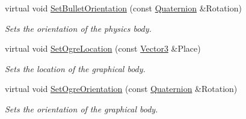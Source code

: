 \begin{DoxyCompactItemize}
virtual void \hyperlink{classMezzanine_1_1ActorBase_a088bc9b26f4747e6f2896591a0f7b190}{SetBulletOrientation} (const \hyperlink{classMezzanine_1_1Quaternion}{Quaternion} \&Rotation)
\begin{DoxyCompactList}\small\item\em Sets the orientation of the physics body. \item\end{DoxyCompactList}\item 
virtual void \hyperlink{classMezzanine_1_1ActorBase_a4b2a3281be30dcc983b514ecaff14a51}{SetOgreLocation} (const \hyperlink{classMezzanine_1_1Vector3}{Vector3} \&Place)
\begin{DoxyCompactList}\small\item\em Sets the location of the graphical body. \item\end{DoxyCompactList}\item 
virtual void \hyperlink{classMezzanine_1_1ActorBase_a5958552c8b356775b5447c0bd6448102}{SetOgreOrientation} (const \hyperlink{classMezzanine_1_1Quaternion}{Quaternion} \&Rotation)
\begin{DoxyCompactList}\small\item\em Sets the orientation of the graphical body. \item\end{DoxyCompactList}\end{DoxyCompactItemize}
